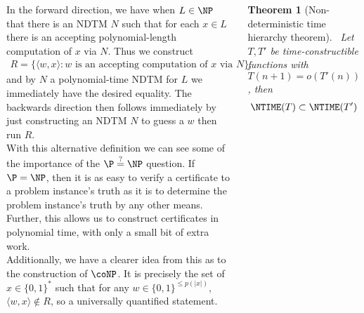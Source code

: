 \documentclass{tikzposter} %
\newtheorem{theorem}{Theorem}
\begin{document}
\begin{columns}
{  In the forward direction, we have when $L \in \NP$ that there is an NDTM $N$ such that for each $x \in L$ there is an accepting polynomial-length computation of $x$ via $N$. Thus we construct
  \begin{align*}
    R = \{ \langle w, x \rangle : w \text{ is an accepting computation of } x \text{ via } N \},
  \end{align*}
  and by $N$ a polynomial-time NDTM for $L$ we immediately have the desired equality. The backwards direction then follows immediately by just constructing an NDTM $N$ to guess a $w$ then run $R$. \\

  With this alternative definition we can see some of the importance of the $\P \overset{?}{=} \NP$ question. If $\P = \NP$, then it is as easy to verify a certificate to a problem instance's truth as it is to determine the problem instance's truth by any other means. Further, this allows us to construct certificates in polynomial time, with only a small bit of extra work. \\

  Additionally, we have a clearer idea from this as to the construction of $\coNP$. It is precisely the set of $x \in \{0,1\}^{*}$ such that for any $w \in \{0,1\}^{\le p(|x|)}$, $\langle w, x \rangle \notin R$, so a universally quantified statement. \\

  \begin{theorem}[Non-deterministic time hierarchy theorem]
    \ Let $T,T'$ be time-constructible functions with $T(n+1) = o(T'(n))$, then
    \begin{align*}
      \NTIME(T) \subset \NTIME(T')
    \end{align*}
  \end{theorem}
  \hphantom{}

  }
\end{columns}
\end{document}
